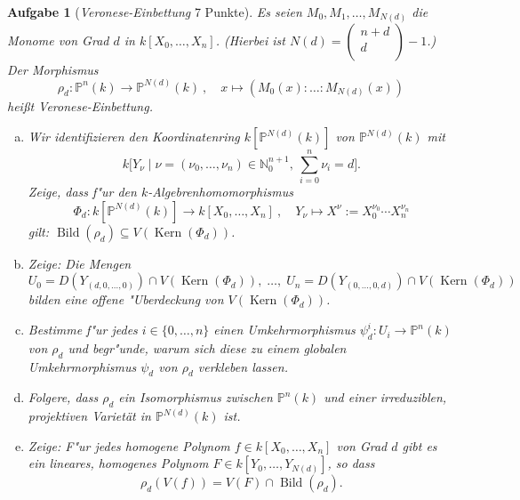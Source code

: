 \documentclass[a4paper, 12pt, numbers=noendperiod, chapterprefix=true, headsepline]{scrbook}
\theoremstyle{break}
\newtheorem{Aufg}{Aufgabe}
\theoremstyle{nonumberbreak}
\theoremstyle{nonumberplain}
\newcommand{\quot}[1]{\textrm{\glqq}{#1}\textrm{\grqq}}
\newcommand{\textvector}[2]{\left(\begin{smallmatrix} #1\\ #2\\ \end{smallmatrix}\right)}
\DeclareMathOperator{\Bild}{Bild}
\DeclareMathOperator{\Kern}{Kern}
\newcommand{\N}{\mathbb{N}}
\newcommand{\IP}{\mathbb{P}}%
\begin{document}
\begin{Aufg}[\textit{Veronese-Einbettung} 7 Punkte]
Es seien $M_0,M_1,\dots, M_{N(d)}$ die Monome von Grad $d$ in $k[X_0,\dots,X_n]$. (Hierbei ist $N(d) = \textvector{n+d}{d}-1$.) Der Morphismus
	\[\rho_d :\IP^n(k)\to \IP^{N(d)}(k)\ ,\quad x\mapsto (M_0(x):\ldots :M_{N(d)}(x))\]
hei\ss t \emph{Veronese-Einbettung}.
\begin{enumerate}[a)]
	\item Wir identifizieren den Koordinatenring $k[\IP^{N(d)}(k)]$ von $\IP^{N(d)}(k)$ mit
		\[ k\bigl[Y_{\nu}\mid \nu = (\nu_0,\dots,\nu_n) \in \N_0^{n+1},\ \sum_{i=0}^{n} \nu_i = d\bigr].\]
	Zeige, dass f"ur den $k$-Algebrenhomomorphismus
		\[\Phi_d : k[\IP^{N(d)}(k)] \to k[X_0,\dots,X_n]\ ,\quad Y_\nu \mapsto X^\nu := X_0^{\nu_0}\cdots X_n^{\nu_n}\]
	gilt: $\Bild(\rho_d)\subseteq V(\Kern(\Phi_d))$.
	\item Zeige: Die Mengen 
		\[U_0 = D(Y_{(d,0,\dots,0)})\cap V(\Kern(\Phi_d)),\; \dots,\; U_n = D(Y_{(0,\dots,0,d)})\cap V(\Kern(\Phi_d))\]
	bilden eine offene "Uberdeckung von $V(\Kern(\Phi_d))$.
	\item Bestimme f"ur jedes $i\in \{0,\dots, n\}$ einen Umkehrmorphismus $\psi_d^i:U_i \to \IP^n(k)$ von $\rho_d$ und begr"unde, warum sich diese zu einem globalen Umkehrmorphismus $\psi_d$ von $\rho_d$ \quot{verkleben} lassen.
	\item Folgere, dass $\rho_d$ ein Isomorphismus zwischen $\IP^n(k)$ und einer irreduziblen, projektiven Variet\"at in $\IP^{N(d)}(k)$ ist.
	\item Zeige: F"ur jedes homogene Polynom $f\in k[X_0,\dots,X_n]$ von Grad $d$ gibt es ein lineares, homogenes Polynom $F\in k[Y_0,\dots,Y_{N(d)}]$, so dass
		\[\rho_d(V(f)) = V(F)\cap \Bild(\rho_d).\]
\end{enumerate}\end{Aufg}
\end{document}
